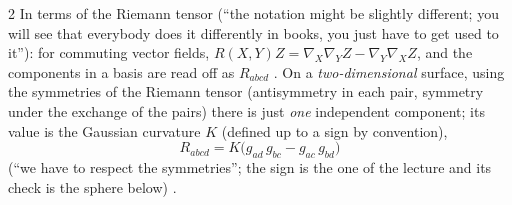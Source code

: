 \begin{paracol}{2}
In terms of the Riemann tensor (``the notation might be slightly different; you will see that everybody does it differently in books, you just have to get used to it''): for commuting vector fields, $R(X,Y)Z=\nabla_X\nabla_YZ-\nabla_Y\nabla_XZ$, and the components in a basis are read off as $R_{abcd}$ . On a \emph{two-dimensional} surface, using the symmetries of the Riemann tensor (antisymmetry in each pair, symmetry under the exchange of the pairs) there is just \emph{one} independent component; its value is the Gaussian curvature $K$ (defined up to a sign by convention),
\begin{equation}\label{eq:c16-K}
  R_{abcd}=K\bigl(g_{ad}\,g_{bc}-g_{ac}\,g_{bd}\bigr)
\end{equation}
(``we have to respect the symmetries''; the sign is the one of the lecture and its check is the sphere below) .


\end{paracol}
